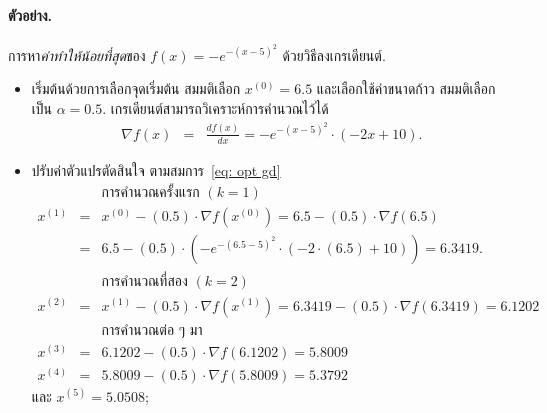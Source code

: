 \paragraph{ตัวอย่าง.}
การหา\textit{ค่าทำให้น้อยที่สุด}ของ $f(x) = - e^{ - (x-5)^2 }$ ด้วยวิธีลงเกรเดียนต์.
%
	\begin{itemize}
		\item
	เริ่มต้นด้วยการเลือกจุดเริ่มต้น สมมติเลือก $x^{(0)} = 6.5$ และเลือกใช้ค่าขนาดก้าว
	สมมติเลือกเป็น $\alpha = 0.5$.
	เกรเดียนต์สามารถวิเคราะห์การคำนวณไว้ได้
		\begin{eqnarray}
		\nabla f(x) &=& 
		\frac{d f(x)}{d x} = - e^{ - (x-5)^2 } \cdot (-2 x + 10).
		\nonumber   
		\end{eqnarray} 
%	
		\item ปรับค่าตัวแปรตัดสินใจ ตามสมการ~\ref{eq: opt gd}
		\\ 
		\begin{eqnarray}
		&\;& \mbox{การคำนวณครั้งแรก } (k=1)
		\nonumber \\
		x^{(1)} &=& x^{(0)} - (0.5) \cdot \nabla f (x^{(0)})
		= 6.5 - (0.5) \cdot \nabla f (6.5) 
		\nonumber \\ 
		&=& 6.5 - (0.5) \cdot \left(- e^{ - (6.5-5)^2 } \cdot (-2 \cdot (6.5) + 10) \right) 
		= 6.3419.
		\nonumber
\\		
		&\;& \mbox{การคำนวณที่สอง } (k=2)
\nonumber \\
		x^{(2)} &=& x^{(1)} - (0.5) \cdot \nabla f (x^{(1)})
 = 6.3419 - (0.5) \cdot \nabla f (6.3419) = 6.1202
\nonumber
\\
		&\;& \mbox{การคำนวณต่อ ๆ มา}
\nonumber \\
		x^{(3)} &=& 6.1202 - (0.5) \cdot \nabla f (6.1202) = 5.8009
\nonumber
\\
x^{(4)} &=& 5.8009 - (0.5) \cdot \nabla f (5.8009) = 5.3792
\nonumber 
\end{eqnarray}
%
และ $x^{(5)} = 5.0508$;

\end{itemize}
